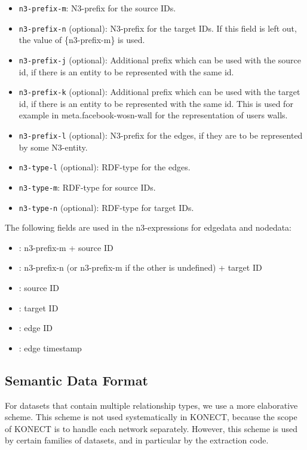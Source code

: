 \documentclass{article}
\begin{document}
\begin{itemize}
\begin{itemize}
    Additional N3-data, to be displayed with the
    first occurence of the target ID.
  \item \texttt{n3-prefix-m}: N3-prefix for the
    source IDs.
  \item \texttt{n3-prefix-n} (optional): N3-prefix
    for the target IDs. If this field is left out,
    the value of \{n3-prefix-m\} is used.
  \item \texttt{n3-prefix-j} (optional):
    Additional prefix which can be used with the
    source id, if there is an entity to be
    represented with the same id.
  \item \texttt{n3-prefix-k} (optional):
    Additional prefix which can be used with the
    target id, if there is an entity to be
    represented with the same id. This is used for
    example in meta.facebook-wosn-wall for the
    representation of users walls.
  \item \texttt{n3-prefix-l} (optional): N3-prefix
    for the edges, if they are to be represented
    by some N3-entity.
  \item \texttt{n3-type-l} (optional): RDF-type
    for the edges.
  \item \texttt{n3-type-m}: RDF-type for source
    IDs.
  \item \texttt{n3-type-n} (optional): RDF-type
    for target IDs.
  \end{itemize}
  The following fields are used in the n3-expressions for
  edgedata and nodedata:
  \begin{itemize}
  \item[\texttt{\$m}]: n3-prefix-m + source ID
  \item[\texttt{\$n}]: n3-prefix-n (or n3-prefix-m
    if the other is undefined) + target ID
  \item[\texttt{\$j}]: source ID
  \item[\texttt{\$k}]: target ID
  \item[\texttt{\$l}]: edge ID
  \item[\texttt{\$timestamp}]: edge timestamp
  \end{itemize}
\end{itemize}

\subsection{Semantic Data Format}
For datasets that contain multiple relationship types, we use a more
elaborative scheme.  This scheme is not used systematically in KONECT,
because the scope of KONECT is to handle each network separately.
However, this scheme is used by certain families of datasets, and in
particular by the extraction code. 
\end{document}
